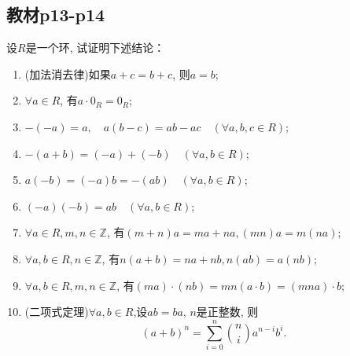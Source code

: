 \subsection{教材p13-p14}

\begin{problem}\label{ex:1.2.1}
    设$R$是一个环, 试证明下述结论：
\begin{enumerate}[(1)]
    \item (加法消去律)\quad 如果$a + c = b + c$, 则$a = b$;
    \item $\forall a\in R$, 有$a \cdot 0_R = 0_R$;
    \item $-(-a) = a,\quad a(b - c) = ab - ac \quad (\forall a, b, c \in R)$;
    \item $-(a + b) = (-a) + (-b) \quad (\forall a, b \in R)$;
    \item $a(-b) = (-a)b = -(ab) \quad (\forall a, b \in R)$;
    \item $(-a)(-b) = ab \quad (\forall a, b \in R)$;
    \item $\forall a \in R, m, n \in \mathbb{Z}$, 有$(m + n)a = ma + na, (mn)a = m(na)$;
    \item $\forall a, b \in R, n \in \mathbb{Z}$, 有$n(a + b) = na + nb, n(ab) = a(nb)$;
    \item $\forall a, b \in R, m, n \in \mathbb{Z}$, 有$(ma) \cdot (nb) = mn(a \cdot b) = (mna) \cdot b$;
    \item (二项式定理)\quad $\forall a, b \in R$,设$ab = ba$, $n$是正整数, 则
    \[
        (a + b)^n = \sum_{i = 0}^n \binom{n}{i} a^{n - i}b^i.
    \]
\end{enumerate}
\end{problem}

